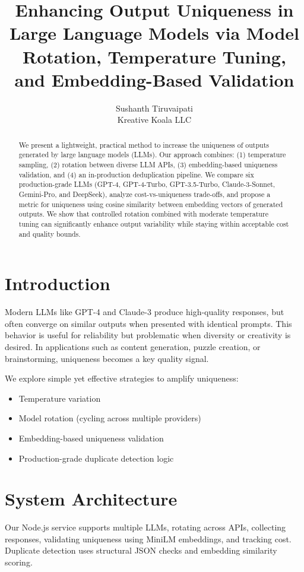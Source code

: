\documentclass{article}
\title{Enhancing Output Uniqueness in Large Language Models via Model Rotation, Temperature Tuning, and Embedding-Based Validation}
\author{Sushanth Tiruvaipati \\ \small Kreative Koala LLC}
\date{}
\begin{document}
\maketitle

\begin{abstract}
We present a lightweight, practical method to increase the uniqueness of outputs generated by large language models (LLMs). Our approach combines: (1) temperature sampling, (2) rotation between diverse LLM APIs, (3) embedding-based uniqueness validation, and (4) an in-production deduplication pipeline. We compare six production-grade LLMs (GPT-4, GPT-4-Turbo, GPT-3.5-Turbo, Claude-3-Sonnet, Gemini-Pro, and DeepSeek), analyze cost-vs-uniqueness trade-offs, and propose a metric for uniqueness using cosine similarity between embedding vectors of generated outputs. We show that controlled rotation combined with moderate temperature tuning can significantly enhance output variability while staying within acceptable cost and quality bounds.
\end{abstract}

\section{Introduction}
Modern LLMs like GPT-4 and Claude-3 produce high-quality responses, but often converge on similar outputs when presented with identical prompts. This behavior is useful for reliability but problematic when diversity or creativity is desired. In applications such as content generation, puzzle creation, or brainstorming, uniqueness becomes a key quality signal.

We explore simple yet effective strategies to amplify uniqueness:
\begin{itemize}
  \item Temperature variation
  \item Model rotation (cycling across multiple providers)
  \item Embedding-based uniqueness validation
  \item Production-grade duplicate detection logic
\end{itemize}

\section{System Architecture}
Our Node.js service supports multiple LLMs, rotating across APIs, collecting responses, validating uniqueness using MiniLM embeddings, and tracking cost. Duplicate detection uses structural JSON checks and embedding similarity scoring.
\end{document}
